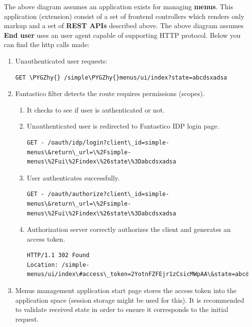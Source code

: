 \documentclass[letterpaper,10pt,english]{sphinxmanual}
\def\PYGZhy{\char`\-}
\begin{document}
The above diagram assumes an application exists for managing \textbf{menus}. This application (extension) consist of a set of frontend
controllers which renders only markup and a set of \textbf{REST APIs} described above. The above diagram assumes \textbf{End user} uses an
user agent capable of supporting HTTP protocol. Below you can find the http calls made:
\begin{enumerate}
\item {} 
Unauthenticated user requests:

\begin{Verbatim}[commandchars=\\\{\}]
GET \PYGZhy{} /simple\PYGZhy{}menus/ui/index?state=abcdsxadsa
\end{Verbatim}

\item {} 
Fantastico filter detects the route requires permissions (scopes).
\begin{enumerate}
\item {} 
It checks to see if user is authenticated or not.

\item {} 
Unauthenticated user is redirected to Fantastico IDP login page.

\begin{Verbatim}[commandchars=\\\{\}]
GET - /oauth/idp/login?client\_id=simple-menus\&return\_url=\%2Fsimple-menus\%2Fui\%2Findex\%26state\%3Dabcdsxadsa
\end{Verbatim}

\item {} 
User authenticates successfully.

\begin{Verbatim}[commandchars=\\\{\}]
GET - /oauth/authorize?client\_id=simple-menus\&return\_url=\%2Fsimple-menus\%2Fui\%2Findex\%26state\%3Dabcdsxadsa
\end{Verbatim}

\item {} 
Authorization server correctly authorizes the client and generates an access token.

\begin{Verbatim}[commandchars=\\\{\}]
HTTP/1.1 302 Found
Location: /simple-menus/ui/index\#access\_token=2YotnFZFEjr1zCsicMWpAA\&state=abcdsxadsa\&token\_type=bearer\&expires\_in=3600
\end{Verbatim}

\end{enumerate}

\item {} 
Menus management application start page stores the access token into the application space (session storage might be used for this).
It is recommended to validate received state in order to ensure it corresponds to the initial request.

\end{enumerate}
\end{document}
